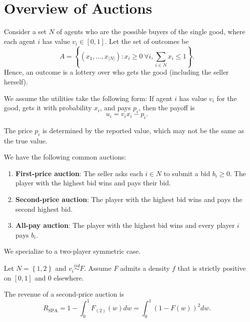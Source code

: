 \section{Overview of Auctions}

Consider a set $N$ of agents who are the possible buyers of the single good, where each agent $i $ has value $v_i \in [0,1]$. Let the set of outcomes be \[
	A = \left\{\left( x_1,\ldots,x_{\left| N \right|} \right): x_i \ge 0\  \forall i, \sum\limits_{i \in N}^{} x_i \le 1\right\}
.\] Hence, an outcome is a lottery over who gets the good (including the seller herself).

\begin{assumption}
	We assume the utilities take the following form: If agent $i$ has value $v_i$ for the good, gets it with probability $x_i$, and pays $p_i$, then the payoff is \[
		u_i = v_i x_i - p_i
	.\] 

	The price $p_i$ is determined by the reported value, which may not be the same as the true value.
\end{assumption}

\begin{example}
	We have the following common auctions:
	\begin{enumerate}[label = (\roman*)]
		\item \textbf{First-price auction}: The seller asks each $i \in N$ to submit a bid $b_i \ge 0$. The player with the highest bid wins and pays their bid.
		\item \textbf{Second-price auction}: The player with the highest bid wins and pays the second highest bid.
		\item \textbf{All-pay auction}: The player with the highest bid wins and every player $i$ pays $b_i$.
	\end{enumerate}
\end{example}

We specialize to a two-player symmetric case.

\begin{assumption}
	Let $N = \left\{1,2\right\}$ and $v_i \overset{iid}{\sim} F$. Assume $F$ admits a density $f$ that is strictly positive on $[0,1]$ and $0$ elsewhere.
\end{assumption}

\begin{proposition}
	The revenue of a second-price auction is \[
		R_{\text{SPA}} = 1 - \int_{0}^{1} F_{(2)}(w)dw = \int_{0}^{1} \left( 1-F(w) \right)^2dw 
	.\] 
\end{proposition}

